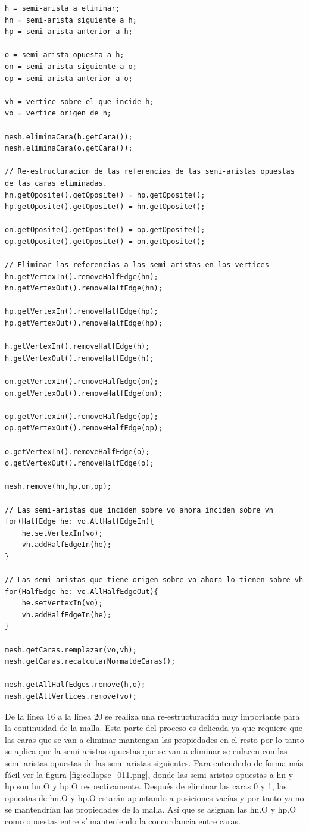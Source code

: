 \begin{lstlisting}[frame=single]
h = semi-arista a eliminar;
hn = semi-arista siguiente a h;
hp = semi-arista anterior a h;

o = semi-arista opuesta a h;
on = semi-arista siguiente a o;
op = semi-arista anterior a o;

vh = vertice sobre el que incide h;
vo = vertice origen de h;

mesh.eliminaCara(h.getCara());
mesh.eliminaCara(o.getCara());

// Re-estructuracion de las referencias de las semi-aristas opuestas de las caras eliminadas.
hn.getOposite().getOposite() = hp.getOposite();
hp.getOposite().getOposite() = hn.getOposite();

on.getOposite().getOposite() = op.getOposite();
op.getOposite().getOposite() = on.getOposite();

// Eliminar las referencias a las semi-aristas en los vertices
hn.getVertexIn().removeHalfEdge(hn);
hn.getVertexOut().removeHalfEdge(hn);

hp.getVertexIn().removeHalfEdge(hp);
hp.getVertexOut().removeHalfEdge(hp);

h.getVertexIn().removeHalfEdge(h);
h.getVertexOut().removeHalfEdge(h);

on.getVertexIn().removeHalfEdge(on);
on.getVertexOut().removeHalfEdge(on);

op.getVertexIn().removeHalfEdge(op);
op.getVertexOut().removeHalfEdge(op);

o.getVertexIn().removeHalfEdge(o);
o.getVertexOut().removeHalfEdge(o);

mesh.remove(hn,hp,on,op);

// Las semi-aristas que inciden sobre vo ahora inciden sobre vh
for(HalfEdge he: vo.AllHalfEdgeIn){
	he.setVertexIn(vo);
	vh.addHalfEdgeIn(he);
}

// Las semi-aristas que tiene origen sobre vo ahora lo tienen sobre vh
for(HalfEdge he: vo.AllHalfEdgeOut){
	he.setVertexIn(vo);
	vh.addHalfEdgeIn(he);
}

mesh.getCaras.remplazar(vo,vh);
mesh.getCaras.recalcularNormaldeCaras();

mesh.getAllHalfEdges.remove(h,o);
mesh.getAllVertices.remove(vo);

\end{lstlisting}

De la línea 16 a la línea 20 se realiza una re-estructuración muy importante para la continuidad de la malla. Esta parte del proceso es delicada ya que requiere que las caras que se van a eliminar mantengan las propiedades en el resto por lo tanto se aplica que la semi-aristas opuestas que se van a eliminar se enlacen con las semi-aristas opuestas de las semi-aristas siguientes. Para entenderlo de forma más fácil ver la figura \ref{fig:collapse_011.png}, donde las semi-aristas opuestas a hn y hp son hn.O y hp.O respectivamente. Después de eliminar las caras 0 y 1, las opuestas de hn.O y hp.O estarán apuntando a posiciones vacías y por tanto ya no se mantendrían las propiedades de la malla. Así que se asignan las hn.O y hp.O como opuestas entre sí manteniendo la concordancia entre caras.

